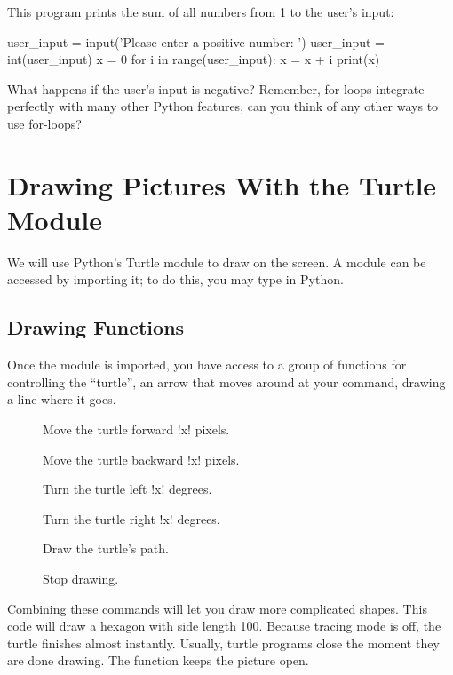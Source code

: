 \documentclass[11pt]{cselabheader}
\begin{document}
This program prints the sum of all numbers from 1 to the user's input:

\begin{python3code}
user_input = input('Please enter a positive number: ')
user_input = int(user_input)
x = 0
for i in range(user_input):
    x = x + i
print(x)
\end{python3code}

What happens if the user's input is negative?
Remember, for-loops integrate perfectly with many other Python features,
can you think of any other ways to use for-loops?


\section{Drawing Pictures With the Turtle Module}

We will use Python's Turtle module to draw on the
screen.  A module can be accessed by importing it; to do this, you may type  in
Python.

\subsection{Drawing Functions}
Once the module is imported, you have access to
a group of functions for controlling the ``turtle'', an arrow
that moves around at your command, drawing a line where it goes.

\begin{description}
\item[  ] Move the turtle forward \pythoninline!x! pixels.
\item[ ] Move the turtle backward \pythoninline!x! pixels.
\item[     ] Turn the turtle left \pythoninline!x! degrees.
\item[    ] Turn the turtle right \pythoninline!x! degrees.
\item[   ] Draw the turtle's path.
\item[     ] Stop drawing.
\end{description}


Combining these commands will let you draw more complicated shapes.
This code will draw a hexagon with side length 100.
Because tracing mode is off, the turtle finishes almost instantly.
Usually, turtle programs close the moment they are done drawing. The function
 keeps the picture open.
\end{document}
